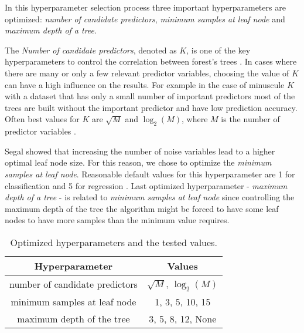In this hyperparameter selection process three important hyperparameters are optimized: \textit{number of candidate predictors}, \textit{minimum samples at leaf node} and \textit{maximum depth of a tree}.

The \textit{Number of candidate predictors}, denoted as $K$, is one of the key hyperparameters to control the correlation between forest's trees \cite{probst2018hyperparameters}.
In cases where there are many or only a few relevant predictor variables, choosing the value of $K$ can have a high influence on the results. For example in the case of minuscule $K$ with a dataset that has only a small number of important predictors most of the trees are built without the important predictor and have low prediction accuracy. \cite{bernard2009influence} Often best values for $K$ are $\sqrt{M}$ and $\log_2(M)$, where $M$ is the number of predictor variables \cite{bernard2009influence}.

Segal \cite{segal2004machine} showed that increasing the number of noise variables lead to a higher optimal leaf node size. For this reason, we chose to optimize the \textit{minimum samples at leaf node}. Reasonable default values for this hyperparameter are 1 for classification and 5 for regression \cite{probst2018hyperparameters}. Last optimized hyperparameter - \textit{maximum depth of a tree} - is related to \textit{minimum samples at leaf node} since controlling the maximum depth of the tree the algorithm might be forced to have some leaf nodes to have more samples than the minimum value requires.

\begin{table}
    \caption{Optimized hyperparameters and the tested values.}
    \begin{tabular}{ | c | c |}
    \hline
    Hyperparameter & Values\\
    \hline
    number of candidate predictors & $\sqrt{M}$, $\log_2(M)$\\
    minimum samples at leaf node & 1, 3, 5, 10, 15\\
    maximum depth of the tree & 3, 5, 8, 12, None\\
    \hline
   \end{tabular}
   \label{tab:hyperparam}
\end{table}

